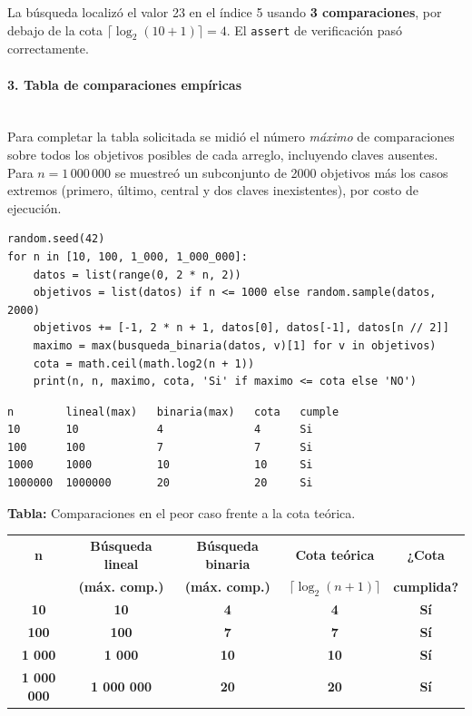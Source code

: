 \documentclass[12pt,a4paper]{article}
\begin{document}
La búsqueda localizó el valor 23 en el índice 5 usando \textbf{3 comparaciones}, por
debajo de la cota $\lceil \log_2(10+1) \rceil = 4$. El \texttt{assert} de verificación
pasó correctamente.

\paragraph{3. Tabla de comparaciones empíricas}\mbox{}\\[4pt]

Para completar la tabla solicitada se midió el número \textit{máximo} de comparaciones
sobre todos los objetivos posibles de cada arreglo, incluyendo claves ausentes. Para
$n = 1\,000\,000$ se muestreó un subconjunto de 2000 objetivos más los casos extremos
(primero, último, central y dos claves inexistentes), por costo de ejecución.

\begin{lstlisting}[style=python,caption={Medición del peor caso para cada tamaño.}]
random.seed(42)
for n in [10, 100, 1_000, 1_000_000]:
    datos = list(range(0, 2 * n, 2))
    objetivos = list(datos) if n <= 1000 else random.sample(datos, 2000)
    objetivos += [-1, 2 * n + 1, datos[0], datos[-1], datos[n // 2]]
    maximo = max(busqueda_binaria(datos, v)[1] for v in objetivos)
    cota = math.ceil(math.log2(n + 1))
    print(n, n, maximo, cota, 'Si' if maximo <= cota else 'NO')
\end{lstlisting}

\begin{lstlisting}[style=consola,caption={Salida de consola.}]
n        lineal(max)   binaria(max)   cota   cumple
10       10            4              4      Si
100      100           7              7      Si
1000     1000          10             10     Si
1000000  1000000       20             20     Si
\end{lstlisting}

\begin{center}
\textbf{Tabla:} Comparaciones en el peor caso frente a la cota teórica.

\vspace{4pt}
\begin{tabular}{|c|c|c|c|c|}
\hline
\textbf{n} & \textbf{Búsqueda lineal} & \textbf{Búsqueda binaria} & \textbf{Cota teórica} & \textbf{¿Cota} \\
 & \textbf{(máx. comp.)} & \textbf{(máx. comp.)} & $\lceil \log_2(n+1) \rceil$ & \textbf{cumplida?} \\
\hline
\textbf{10} & \textbf{10} & \textbf{4} & \textbf{4} & \textbf{Sí} \\
\hline
\textbf{100} & \textbf{100} & \textbf{7} & \textbf{7} & \textbf{Sí} \\
\hline
\textbf{1 000} & \textbf{1 000} & \textbf{10} & \textbf{10} & \textbf{Sí} \\
\hline
\textbf{1 000 000} & \textbf{1 000 000} & \textbf{20} & \textbf{20} & \textbf{Sí} \\
\hline
\end{tabular}
\end{center}
\end{document}
